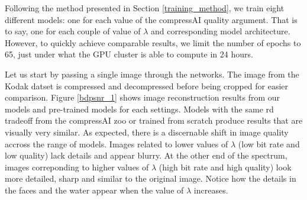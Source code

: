 Following the method presented in Section \ref{training_method}, we train eight different models: one for each value of the compressAI \textsf{quality} argument. That is to say, one for each couple of value of \(\lambda\) and corresponding model architecture. However, to quickly achieve comparable results, we limit the number of epochs to 65, just under what the GPU cluster is able to compute in 24 hours.

Let us start by passing a single image through the networks. The image from the Kodak datset is compressed and decompressed before being cropped for easier comparison. Figure \ref{bdpsnr_1} shows image reconstruction results from our models and pre-trained models for each settings. Models with the same \acrshort{rd} tradeoff from the compressAI zoo or trained from scratch produce results that are visually very similar. As expected, there is a discernable shift in image quality accross the range of models. Images related to lower values of \(\lambda\) (low bit rate and low quality) lack details and appear blurry. At the other end of the spectrum, images correponding to higher values of \(\lambda\) (high bit rate and high quality) look more detailed, sharp and similar to the original image. Notice how the details in the faces and the water appear when the value of \(\lambda\) increases.

